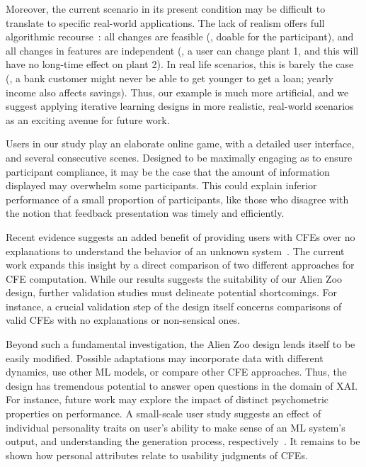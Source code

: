 Moreover, the current scenario in its present condition may be difficult to translate to specific real-world applications.
The lack of realism offers full algorithmic recourse~\citep{karimi_survey_2020}: all changes are feasible (\ie, doable for the participant), and all changes in features are independent (\ie, a user can change plant 1, and this will have no long-time effect on plant 2).
In real life scenarios, this is barely the case (\eg, a bank customer might never be able to get younger to get a loan; yearly income also affects savings). 
Thus, our example is much more artificial, and we suggest applying iterative learning designs in more realistic, real-world scenarios as an exciting avenue for future work.

Users in our study play an elaborate online game, with a detailed user interface, and several consecutive scenes.
Designed to be maximally engaging as to ensure participant compliance, it may be the case that the amount of information displayed may overwhelm some participants.
This could explain inferior performance of a small proportion of participants, like those who disagree with the notion that feedback presentation was timely and efficiently.

Recent evidence suggests an added benefit of providing users with \glspl{CFE} over no explanations to understand the behavior of an unknown system~\citep{van_der_waa_evaluating_2021}.
The current work expands this insight by a direct comparison of two different approaches for \gls{CFE} computation. 
While our results suggests the suitability of our Alien Zoo design, further validation studies must delineate potential shortcomings.
For instance, a crucial validation step of the design itself concerns comparisons of valid \glspl{CFE} with no explanations or non-sensical ones.

Beyond such a fundamental investigation, the Alien Zoo design lends itself to be easily modified.
Possible adaptations may incorporate data with different dynamics, use other \gls{ML} models, or compare other \gls{CFE} approaches.
Thus, the design has tremendous potential to answer open questions in the domain of \gls{XAI}.
For instance, future work may explore the impact of distinct psychometric properties on performance. 
A small-scale user study
suggests an effect of individual personality traits on user's ability to make sense of an \gls{ML} system's output, and understanding the generation process, respectively~\citep{gleaves_role_2020}.
It remains to be shown how personal attributes relate to usability judgments of \glspl{CFE}.

